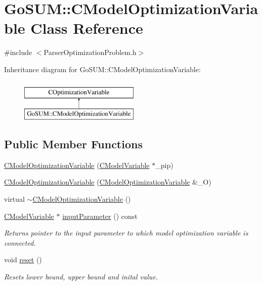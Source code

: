 \hypertarget{class_go_s_u_m_1_1_c_model_optimization_variable}{\section{Go\-S\-U\-M\-:\-:C\-Model\-Optimization\-Variable Class Reference}
\label{class_go_s_u_m_1_1_c_model_optimization_variable}
}


{\ttfamily \#include $<$Parser\-Optimization\-Problem.\-h$>$}

Inheritance diagram for Go\-S\-U\-M\-:\-:C\-Model\-Optimization\-Variable\-:\begin{figure}[H]
\begin{center}
\leavevmode
\includegraphics[height=2.000000cm]{class_go_s_u_m_1_1_c_model_optimization_variable}
\end{center}
\end{figure}
\subsection*{Public Member Functions}
\begin{DoxyCompactItemize}
\item 
\hyperlink{class_go_s_u_m_1_1_c_model_optimization_variable_a901bd687dbccbd0dc8d1cad66b1dea74}{C\-Model\-Optimization\-Variable} (\hyperlink{class_go_s_u_m_1_1_c_model_variable}{C\-Model\-Variable} $\ast$\-\_\-pip)
\item 
\hyperlink{class_go_s_u_m_1_1_c_model_optimization_variable_a27afbb2cec03c53c61fe320f2b76fe91}{C\-Model\-Optimization\-Variable} (\hyperlink{class_go_s_u_m_1_1_c_model_optimization_variable}{C\-Model\-Optimization\-Variable} \&\-\_\-\-O)
\item 
virtual \hyperlink{class_go_s_u_m_1_1_c_model_optimization_variable_a7e6ec9d63b330feff1d6820584cb4ff3}{$\sim$\-C\-Model\-Optimization\-Variable} ()
\item 
\hyperlink{class_go_s_u_m_1_1_c_model_variable}{C\-Model\-Variable} $\ast$ \hyperlink{class_go_s_u_m_1_1_c_model_optimization_variable_a4dc3d3f397b418672f3b271a86dfd066}{input\-Parameter} () const 
\begin{DoxyCompactList}\small\item\em Returns pointer to the input parameter to which model optimization variable is connected. \end{DoxyCompactList}\item 
void \hyperlink{class_go_s_u_m_1_1_c_model_optimization_variable_ab3b5c74ba04de1583eba92aa2844ff71}{reset} ()
\begin{DoxyCompactList}\small\item\em Resets lower bound, upper bound and inital value. \end{DoxyCompactList}\end{DoxyCompactItemize}
